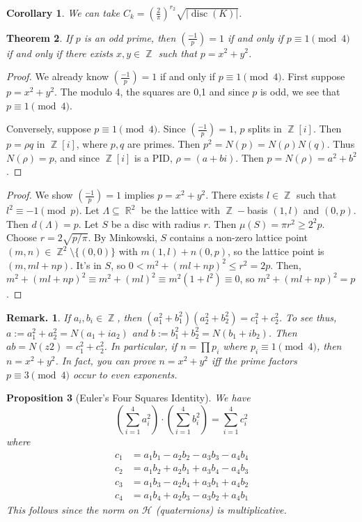 \documentclass[11pt, a4paper]{memoir}
\DeclareMathOperator{\Z}{{\mathbb{Z}}}
\DeclareMathOperator{\R}{{\mathbb{R}}}
\theoremstyle{change}
\newtheorem{theorem}{Theorem}[section]
\newtheorem{corollary}[theorem]{Corollary}
\newtheorem{proposition}[theorem]{Proposition}
\theoremstyle{plain}
\theoremstyle{nonumberplain}
\newtheorem{remark}{Remark.}
\newtheorem{proof}{Proof}
\DeclareMathOperator{\disc}{disc}
\newcommand{\lgs}[2]{\ensuremath{\left(\frac{#1}{#2}\right)}}
\begin{document}
\begin{corollary}
    We can take $C_k=\left(\frac{2}{\pi}\right)^{r_2}\sqrt{|\disc(K)|}$.
\end{corollary}
\begin{theorem}
    If $p$ is an odd prime, then $\lgs{-1}{p}=1$ if and only if $p\equiv 1\pmod{4}$ if and only if there exists $x,y\in\Z$ such that $p=x^2+y^2$.
\end{theorem}
\begin{proof}
    We already know $\lgs{-1}{p}=1$ if and only if $p\equiv 1\pmod{4}$.
    First suppose $p=x^2+y^2$.
    The modulo 4, the squares are 0,1 and since $p$ is odd, we see that $p\equiv 1\pmod{4}$.

    Conversely, suppose $p\equiv 1\pmod{4}$.
    Since $\lgs{-1}{p}=1$, $p$ splits in $\Z[i]$.
    Then $p=\rho q$ in $\Z[i]$, where $p,q$ are primes.
    Then $p^2=N(p)=N(\rho)N(q)$.
    Thus $N(\rho)=p$, and since $\Z[i]$ is a PID, $\rho=(a+bi)$.
    Then $p=N(\rho)=a^2+b^2$.
\end{proof}
\begin{proof}
    We show $\lgs{-1}{p}=1$ implies $p=x^2+y^2$.
    There exists $l\in\Z$ such that $l^2\equiv -1\pmod{p}$.
    Let $\Lambda\subseteq\R^2$ be the lattice with $\Z-$basis $(1,l)$ and $(0,p)$.
    Then $d(\Lambda)=p$.
    Let $S$ be a disc with radius $r$.
    Then $\mu(S)=\pi r^2\geq 2^2p$.
    Choose $r=2\sqrt{p/\pi}$.
    By Minkowski, $S$ contains a non-zero lattice point $(m,n)\in\Z^2\setminus\{(0,0)\}$ with $m(1,l)+n(0,p)$, so the lattice point is $(m,ml+np)$.
    It's in $S$, so $0<m^2+(ml+np)^2\leq r^2=2p$.
    Then, $m^2+(ml+np)^2\equiv m^2+(ml)^2\equiv m^2(1+l^2)\equiv 0$, so $m^2+(ml+np)^2=p$.
\end{proof}
\begin{remark}
    If $a_i,b_i\in\Z$, then $(a_1^2+b_1^2)(a_2^2+b_2^2)=c_1^2+c_2^2$.
    To see thus, $a:=a_1^2+a_2^2=N(a_1+ia_2)$ and $b:=b_1^2+b_2^2=N(b_1+ib_2)$.
    Then $ab=N(z2)=c_1^2+c_2^2$.
    In particular, if $n=\prod p_i$ where $p_i\equiv 1\pmod{4}$, then $n=x^2+y^2$.
    In fact, you can prove $n=x^2+y^2$ iff the prime factors $p\equiv 3\pmod{4}$ occur to even exponents.
\end{remark}
\begin{proposition}[Euler's Four Squares Identity]
    We have
    \begin{equation*}
        \left(\sum_{i=1}^4 a_i^2\right)\cdot\left(\sum_{i=1}^4 b_i^2\right)=\sum_{i=1}^4 c_i^2
    \end{equation*}
    where
    \begin{align*}
        c_1 &= a_1b_1-a_2b_2-a_3b_3-a_4b_4\\
        c_2 &= a_1b_2+a_2b_1+a_3b_4-a_4b_3\\
        c_3 &= a_1b_3-a_2b_4+a_3b_1+a_4b_2\\
        c_4 &= a_1b_4+a_2b_3-a_3b_2+a_4b_1
    \end{align*}
    This follows since the norm on $\mathcal{H}$ (quaternions) is multiplicative.
\end{proposition}
\end{document}
